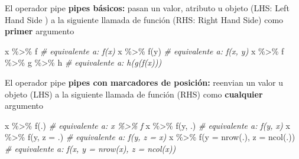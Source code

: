 \documentclass[
  ignorenonframetext,
  aspectratio=169]{beamer}
\newenvironment{Shaded}{\begin{snugshade}}{\end{snugshade}}
\newcommand{\AttributeTok}[1]{\textcolor[rgb]{0.77,0.63,0.00}{#1}}
\newcommand{\CommentTok}[1]{\textcolor[rgb]{0.56,0.35,0.01}{\textit{#1}}}
\newcommand{\FunctionTok}[1]{\textcolor[rgb]{0.00,0.00,0.00}{#1}}
\newcommand{\NormalTok}[1]{#1}
\newcommand{\SpecialCharTok}[1]{\textcolor[rgb]{0.00,0.00,0.00}{#1}}
\begin{document}
\begin{frame}[fragile]{El operador pipe}
\protect\hypertarget{el-operador-pipe}{}
\textbf{pipes básicos:} pasan un valor, atributo u objeto (LHS: Left
Hand Side ) a la siguiente llamada de función (RHS: Right Hand Side)
como \textbf{primer} argumento

\begin{Shaded}
\begin{Highlighting}[]
\NormalTok{x }\SpecialCharTok{\%\textgreater{}\%}\NormalTok{ f }\CommentTok{\# equivalente a: f(x)}
\NormalTok{x }\SpecialCharTok{\%\textgreater{}\%} \FunctionTok{f}\NormalTok{(y) }\CommentTok{\# equivalente a: f(x, y)}
\NormalTok{x }\SpecialCharTok{\%\textgreater{}\%}\NormalTok{ f }\SpecialCharTok{\%\textgreater{}\%}\NormalTok{ g }\SpecialCharTok{\%\textgreater{}\%}\NormalTok{ h }\CommentTok{\# equivalente a: h(g(f(x)))}
\end{Highlighting}
\end{Shaded}
\end{frame}

\begin{frame}[fragile]{El operador pipe}
\protect\hypertarget{el-operador-pipe-1}{}
\textbf{pipes con marcadores de posición:} reenvian un valor u objeto
(LHS) a la siguiente llamada de función (RHS) como \textbf{cualquier}
argumento

\begin{Shaded}
\begin{Highlighting}[]
\NormalTok{x }\SpecialCharTok{\%\textgreater{}\%} \FunctionTok{f}\NormalTok{(.) }\CommentTok{\# equivalente a: x \%\textgreater{}\% f}
\NormalTok{x }\SpecialCharTok{\%\textgreater{}\%} \FunctionTok{f}\NormalTok{(y, .) }\CommentTok{\# equivalente a: f(y, x)}
\NormalTok{x }\SpecialCharTok{\%\textgreater{}\%} \FunctionTok{f}\NormalTok{(y, }\AttributeTok{z =}\NormalTok{ .) }\CommentTok{\# equivalente a: f(y, z = x)}
\NormalTok{x }\SpecialCharTok{\%\textgreater{}\%} \FunctionTok{f}\NormalTok{(}\AttributeTok{y =} \FunctionTok{nrow}\NormalTok{(.),}
        \AttributeTok{z =} \FunctionTok{ncol}\NormalTok{(.))  }\CommentTok{\# equivalente a: f(x, y = nrow(x), z = ncol(x))}
\end{Highlighting}
\end{Shaded}
\end{frame}
\end{document}
